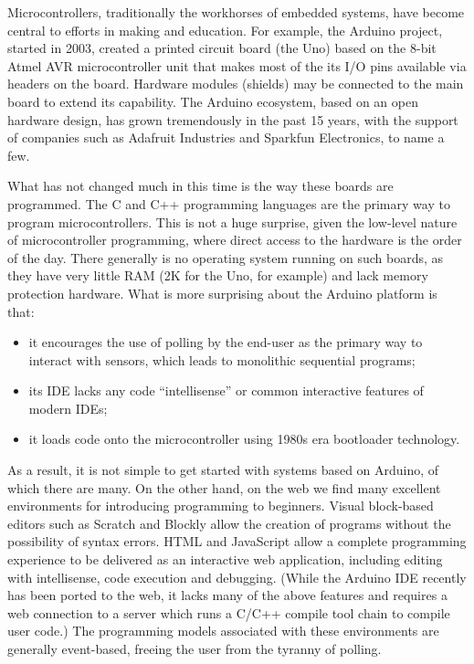 Microcontrollers, traditionally the workhorses of embedded systems, have become 
central to efforts in making and education. For example, the Arduino project, 
started in 2003, created a printed circuit board (the Uno) based on the 8-bit Atmel 
AVR microcontroller unit that makes most of the its I/O pins available via headers on 
the board.  Hardware modules (shields) may be connected to the main board to extend its capability. 
The Arduino ecosystem, based on an open hardware design, has grown tremendously in the past 15 years, 
with the support of companies such as Adafruit Industries and Sparkfun Electronics, to name a few.

What has not changed much in this time is the way these boards are programmed.  
The C and C++ programming languages are the primary way to program microcontrollers. 
This is not a huge surprise, given the low-level nature of microcontroller programming, 
where direct access to the hardware is the order of the day. There generally is no operating 
system running on such boards, as they have very little RAM (2K for the Uno, for example) and 
lack memory protection hardware.  What is more surprising about the Arduino platform is that:
\begin{itemize}
\item it encourages the use of polling by the end-user as the primary way to interact with sensors, 
which leads to monolithic sequential programs;
\item its IDE lacks any code “intellisense” or common interactive features of modern IDEs;
\item it loads code onto the microcontroller using 1980s era bootloader technology.
\end{itemize}
As a result, it is not simple to get started with systems based on Arduino, of which there are many. 
On the other hand, on the web we find many excellent environments for introducing programming to beginners. 
Visual block-based editors such as Scratch and Blockly allow the creation of programs without the possibility 
of syntax errors. HTML and JavaScript allow a complete programming experience to be delivered as an interactive 
web application, including editing with intellisense, code execution and debugging. (While the Arduino IDE recently 
has been ported to the web, it lacks many of the above features and requires a web connection to a server which runs 
a C/C++ compile tool chain to compile user code.) The programming models associated with these environments are 
generally event-based, freeing the user from the tyranny of polling.

